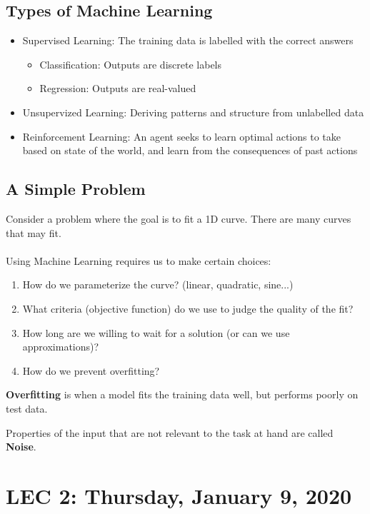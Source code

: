 \documentclass[12pt]{article}
\begin{document}
\subsection*{Types of Machine Learning}
\begin{itemize}
  \item Supervised Learning: The training data is labelled with the correct answers
  \begin{itemize}
    \item Classification: Outputs are discrete labels
    \item Regression: Outputs are real-valued
  \end{itemize}
  \item Unsupervized Learning: Deriving patterns and structure from unlabelled data
  \item Reinforcement Learning: An agent seeks to learn optimal actions to take based on state of the world, and learn from the consequences of past actions
\end{itemize}

\subsection{A Simple Problem}
Consider a problem where the goal is to fit a 1D curve. There are many curves that may fit.
\\
\\
Using Machine Learning requires us to make certain choices:

\begin{enumerate}
  \item How do we parameterize the curve? (linear, quadratic, sine...)
  \item What criteria (objective function) do we use to judge the quality of the fit?
  \item How long are we willing to wait for a solution (or can we use approximations)?
  \item How do we prevent overfitting?
\end{enumerate}

\textbf{Overfitting} is when a model fits the training data well, but performs poorly on test data.

Properties of the input that are not relevant to the task at hand are called \textbf{Noise}.

\section{LEC 2: Thursday, January 9, 2020}
\end{document}
